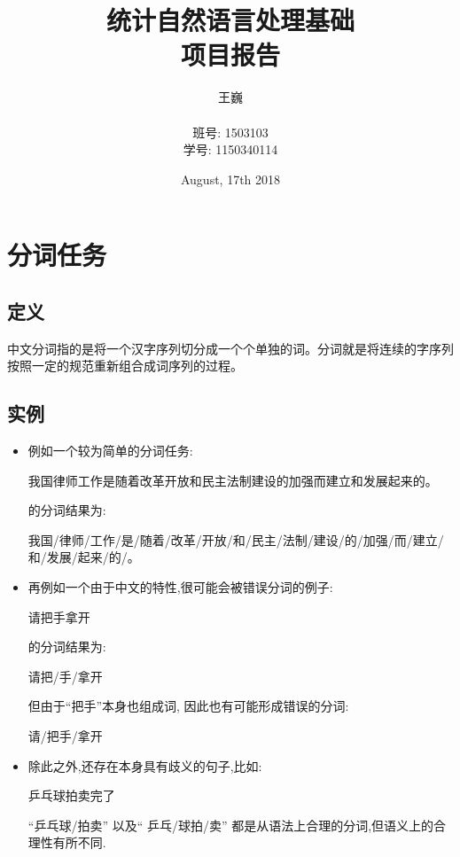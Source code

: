 \documentclass[titlepage]{article}
\begin{document}
\title{统计自然语言处理基础 \\ 项目报告}
\date{August, 17th 2018}
\author{王巍 \\ \\班号: 1503103 \\ 学号: 1150340114}
\maketitle

\section{分词任务}
\subsection{定义}
中文分词指的是将一个汉字序列切分成一个个单独的词。分词就是将连续的字序列按照一定的规范重新组合成词序列的过程。\cite{definition}
\subsection{实例}
\begin{itemize}
\item 例如一个较为简单的分词任务:
\begin{center}
我国律师工作是随着改革开放和民主法制建设的加强而建立和发展起来的。
\end{center}

\noindent 的分词结果为:
\begin{center}
我国/律师/工作/是/随着/改革/开放/和/民主/法制/建设/的/加强/而/建立/和/发展/起来/的/。\\[2em]
\end{center}

\item 再例如一个由于中文的特性,很可能会被错误分词的例子:
\begin{center}
请把手拿开
\end{center}

\noindent 的分词结果为:
\begin{center}
请把/手/拿开
\end{center}

\noindent 但由于``把手''本身也组成词, 因此也有可能形成错误的分词:
\begin{center}
请/把手/拿开
\end{center}

\item 除此之外,还存在本身具有歧义的句子,比如:
\begin{center}
乒乓球拍卖完了
\end{center}

``乒乓球/拍卖'' 以及`` 乒乓/球拍/卖'' 都是从语法上合理的分词,但语义上的合理性有所不同.
\end{itemize}
\end{document}
